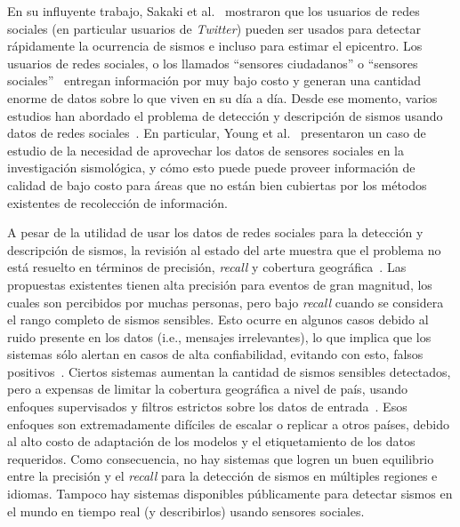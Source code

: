En su influyente trabajo, Sakaki et al.~\cite{sakaki2010earthquake} mostraron que los usuarios de redes sociales (en particular usuarios de \textit{Twitter}) pueden ser usados para detectar rápidamente la ocurrencia de sismos e incluso para estimar el epicentro.
%
Los usuarios de redes sociales, o los llamados ``sensores ciudadanos'' o ``sensores sociales''~\cite{sheth2009citizen} entregan información por muy bajo costo y generan una cantidad enorme de datos sobre lo que viven en su día a día. 
%
Desde ese momento, varios estudios han abordado el problema de detección y descripción de sismos usando datos de redes sociales~\cite{avvenuti2014ears,cameron2012emergency,earle2010omg,earle2012twitter}. 
%
En particular, Young et al.~\cite{young2013transforming} presentaron un caso de estudio de la necesidad de aprovechar los datos de sensores sociales en la investigación sismológica, y cómo esto puede puede proveer información de calidad de bajo costo para áreas que no están bien cubiertas por los métodos existentes de recolección de información.


A pesar de la utilidad de usar los datos de redes sociales para la detección y descripción de sismos, la revisión al estado del arte muestra que el problema no está resuelto en términos de precisión, {\em recall} y cobertura geográfica~\cite{young2013transforming}.
%
Las propuestas existentes tienen alta precisión para eventos de gran magnitud, los cuales son percibidos por muchas personas, pero bajo {\em recall} cuando se considera el rango completo de sismos sensibles.
%
Esto ocurre en algunos casos debido al ruido presente en los datos (i.e., mensajes irrelevantes), lo que implica que los sistemas sólo alertan en casos de alta confiabilidad, evitando con esto, falsos positivos~\cite{earle2010omg,earle2012twitter,avvenuti2014ears}.
%
Ciertos sistemas aumentan la cantidad de sismos sensibles detectados, pero a expensas de limitar la cobertura geográfica a nivel de país, usando enfoques supervisados y filtros estrictos sobre los datos de entrada~\cite{avvenuti2014ears,sakaki2013tweet}.
%
Esos enfoques son extremadamente difíciles de escalar o replicar a otros países, debido al alto costo de adaptación de los modelos y el etiquetamiento de los datos requeridos.
%
Como consecuencia, no hay sistemas que logren un buen equilibrio entre la precisión y el {\em recall} para la detección de sismos en múltiples regiones e idiomas. 
%
Tampoco hay sistemas disponibles públicamente para detectar sismos en el mundo en tiempo real (y describirlos) usando sensores sociales. 


